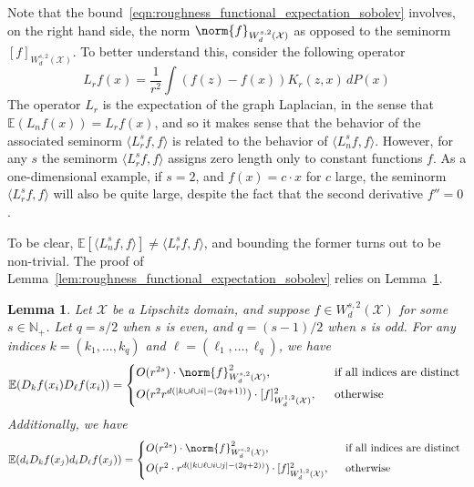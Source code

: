 \documentclass{article}
\newcommand{\abs}[1]{\left \lvert #1 \right \rvert}
\newcommand{\1}{\mathbf{1}}
\newcommand{\Xset}{\mathcal{X}}
\newcommand{\Ebb}{\mathbb{E}}
\newcommand{\dotp}[2]{\langle #1, #2 \rangle}
\theoremstyle{alden}
\theoremstyle{aldenthm}
\newtheorem{lemma}{Lemma}
\theoremstyle{definition}
\theoremstyle{remark}
\begin{document}
Note that the bound~\eqref{eqn:roughness_functional_expectation_sobolev} involves, on the right hand side, the norm $\norm{f}_{W_d^{s,2}(\Xset)}$ as opposed to the seminorm $[f]_{W_d^{s,2}(\Xset)}$. To better understand this, consider the following operator
\begin{equation*}
L_rf(x) = \frac{1}{r^2}\int (f(z) - f(x))K_r(z,x) \,dP(x)
\end{equation*} 
The operator $L_r$ is the expectation of the graph Laplacian, in the sense that $\Ebb(L_nf(x)) = L_rf(x)$, and so it makes sense that the behavior of the associated seminorm $\dotp{L_r^sf}{f}$ is related to the behavior of $\dotp{L_n^sf}{f}$. However, for any $s$ the seminorm $\dotp{L_r^sf}{f}$ assigns zero length only to constant functions $f$. As a one-dimensional example, if $s = 2$, and $f(x) = c \cdot x$ for $c$ large, the seminorm $\dotp{L_r^sf}{f}$ will also be quite large, despite the fact that the second derivative $f'' = 0$. 

To be clear, $\Ebb[\dotp{L_n^sf}{f}] \neq \dotp{L_r^sf}{f}$, and bounding the former turns out to be non-trivial. The proof of Lemma~\ref{lem:roughness_functional_expectation_sobolev} relies on Lemma~\ref{lem:expected_difference_operators_sobolev}.

\begin{lemma}
	\label{lem:expected_difference_operators_sobolev}
	Let $\Xset$ be a Lipschitz domain, and suppose $f \in W_d^{s,2}(\Xset)$ for some $s \in \mathbb{N}_{+}$. Let $q = s/2$ when $s$ is even, and $q = (s - 1)/2$ when $s$ is odd. For any indices $k = (k_1,\ldots,k_q)$ and $\ell = (\ell_1,\ldots,\ell_q)$, we have
	\begin{equation}
	\label{eqn:expected_difference_operators_sobolev_1}
	\Ebb(D_kf(x_i) D_\ell f(x_i)) =
	\begin{cases*}
	O(r^{2s}) \cdot \norm{f}_{W_d^{s,2}(\Xset)}^2, & ~~\textrm{if all indices are distinct} \\
	O(r^{2} r^{d(\abs{k \cup \ell \cup i} - (2q + 1))})\cdot [f]_{W_d^{1,2}(\Xset)}^2, & ~~\textrm{otherwise}~ 
	\end{cases*}
	\end{equation}
	Additionally, we have
	\begin{equation}
	\label{eqn:expected_difference_operators_sobolev_2}
	\Ebb(d_iD_kf(x_j) d_iD_\ell f(x_j)) =
	\begin{cases*}
	O(r^{2s}) \cdot \norm{f}_{W_d^{s,2}(\Xset)}^2, & ~~\textrm{if all indices are distinct} \\
	O(r^{2} \cdot r^{d(\abs{k \cup \ell \cup i \cup j} - (2q + 2))}) \cdot [f]_{W_d^{1,2}(\Xset)}^2, & ~~\textrm{otherwise}~ 
	\end{cases*}
	\end{equation}
\end{lemma}
\end{document}
